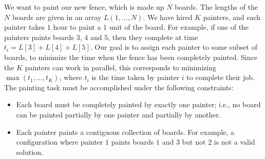 We want to paint our new fence, which is made up $N$ boards. The
lengths of the $N$ boards are given in an array
$L(1,\ldots,N)$. We have hired $K$ painters, and
each painter takes $1$ hour to paint a $1$ unit of the board. For example,
if one of the painters paints boards $3$, $4$ and $5$, then they
complete at time $t_i=L[3]+L[4]+L[5]$. Our goal is to assign each
painter to some subset of boards, to minimize the time when the fence
has been completely painted. Since the $K$ painters can work in
parallel, this corresponds to minimizing $\max(t_1,\ldots,t_K)$, where
$t_i$ is the time taken by painter $i$ to complete their job. The
painting task must be accomplished under the following constraints:
\begin{itemize}
    \item Each board must be completely painted by exactly one painter;
      i.e., no board can be painted partially by one painter and partially
      by another.
    \item Each painter paints a contiguous collection of boards.  For example, a
      configuration where painter $1$ paints boards $1$ and $3$ but not
      $2$ is not a valid solution.
\end{itemize}

